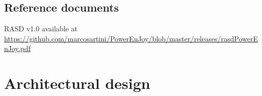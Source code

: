 \documentclass{scrreprt}
\begin{document}
\section{Reference documents}
RASD v1.0 available at \url{https://github.com/marcosartini/PowerEnJoy/blob/master/releases/rasdPowerEnJoy.pdf}

\begin{comment}
\section{Document structure}
\end{comment}

\chapter{Architectural design}
\end{document}
